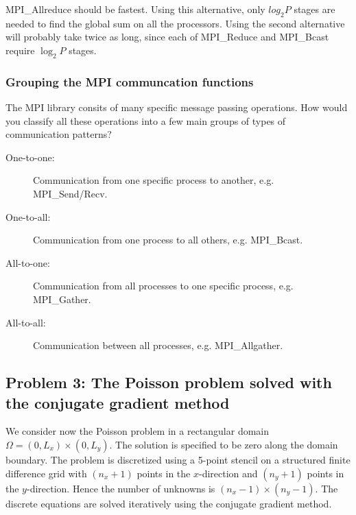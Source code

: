 MPI\_Allreduce should be fastest. Using this alternative, only $log_2 P$ stages are needed to find the global sum on all the processors. Using the second alternative will probably take twice as long, since each of MPI\_Reduce and MPI\_Bcast require $\log_2 P$ stages.



\subsubsection{Grouping the MPI communcation functions} %
\label{ssub:grouping_the_mpi_communcation_functions}

\begin{question}
  The MPI library consits of many specific message passing operations. How would you classify all these operations into a few main groups of types of communication patterns?
\end{question}

\begin{description}
  \item[One-to-one:] Communication from one specific process to another, e.g. MPI\_Send/Recv.
  \item[One-to-all:] Communication from one process to all others, e.g. MPI\_Bcast.
  \item[All-to-one:] Communication from all processes to one specific process, e.g. MPI\_Gather.
  \item[All-to-all:] Communication between all processes, e.g. MPI\_Allgather.
\end{description}




\subsection{Problem 3: The Poisson problem solved with the conjugate gradient method} %
\label{sub:problem_3_the_poisson_problem_solved_with_the_conjugate_gradient_method}

\begin{question}
  We consider now the Poisson problem in a rectangular domain $\Omega = (0,L_x) \times (0,L_y)$. The solution is specified to be zero along the domain boundary. The problem is discretized using a 5-point stencil on a structured finite difference grid with $(n_x+1)$ points in the $x$-direction and $(n_y+1)$ points in the $y$-direction. Hence the number of unknowns is $(n_x-1)\times (n_y-1)$. The discrete equations are solved iteratively using the conjugate gradient method.
\end{question}

